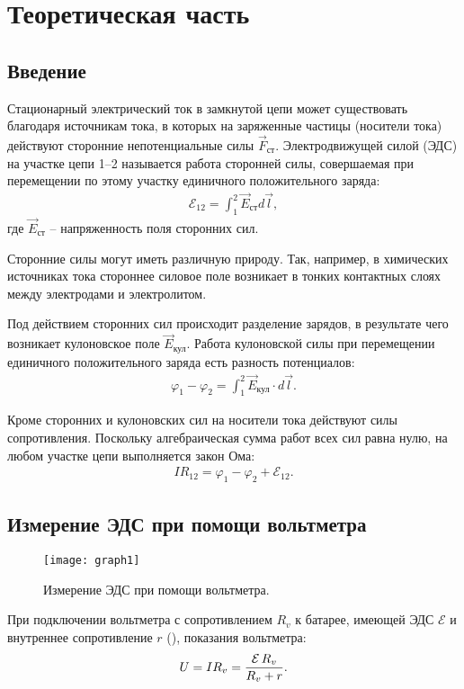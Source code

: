 \section{Теоретическая часть}

\subsection{Введение}
Стационарный электрический ток в замкнутой цепи может существовать благодаря источникам тока, в которых на заряженные частицы (носители тока) действуют сторонние непотенциальные силы $\vec{F}_{\text{ст}}$. Электродвижущей силой (ЭДС) на участке цепи 1--2 называется работа сторонней силы, совершаемая при перемещении по этому участку единичного положительного заряда:
\begin{align} \label{eq:1}
	\mathcal{E}_{12} = \int_{1}^{2} \vec{E}_{\text{ст}} d\vec{l},
\end{align}
где $\vec{E}_{\text{ст}}$ -- напряженность поля сторонних сил.

Сторонние силы могут иметь различную природу. Так, например, в химических источниках тока стороннее силовое поле возникает в тонких контактных слоях между электродами и электролитом.

Под действием сторонних сил происходит разделение зарядов, в результате чего возникает кулоновское поле $\vec{E}_{\text{кул}}$. Работа кулоновской силы при перемещении единичного положительного заряда есть разность потенциалов:
\begin{align} \label{eq:2}
	\varphi_1 - \varphi_2 = \int_{1}^{2} \vec{E}_{\text{кул}} \cdot d\vec{l}.
\end{align}

Кроме сторонних и кулоновских сил на носители тока действуют силы сопротивления. Поскольку алгебраическая сумма работ всех сил равна нулю, на любом участке цепи выполняется закон Ома:
\begin{align} \label{eq:3}
	I R_{12} = \varphi_1 - \varphi_2 + \mathcal{E}_{12}.
\end{align}

\subsection{Измерение ЭДС при помощи вольтметра}
\begin{figure}[H]
	\centering
	\texttt{[image: graph1]}
	\caption{Измерение ЭДС при помощи вольтметра.}
	\label{fig:1}
\end{figure}
При подключении вольтметра с сопротивлением $R_v$ к батарее, имеющей ЭДС $\mathcal{E}$ и внутреннее сопротивление $r$ (), показания вольтметра:
\begin{align} \label{eq:4}
	U = I R_v = \frac{\operatorname{\mathcal{E}} R_v}{R_v + r}.
\end{align}

